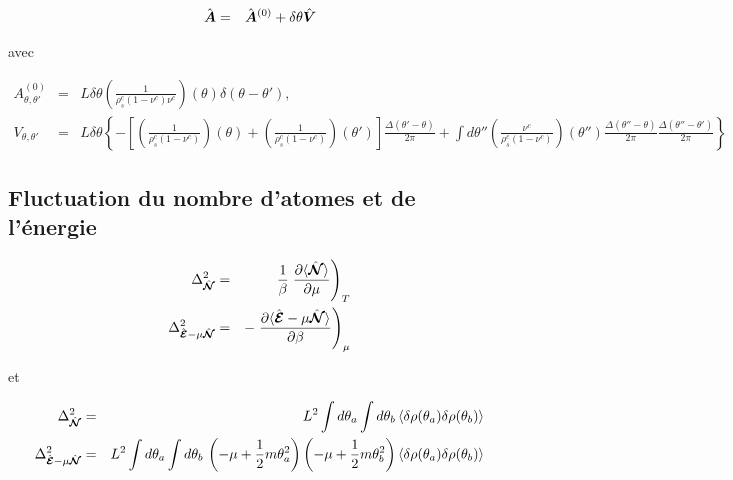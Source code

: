 {\begin{aff}
\begin{eqnarray*}
	\hat{\bm{A}} & = & \hat{\bm{A}}^{(0)} + \delta \theta \hat{\bm{V}}
\end{eqnarray*}

avec 

\begin{eqnarray*}
	A^{(0)}_{\theta , \theta'}  & = &  L\delta \theta \left ( \frac{ 1}{\rho^c_s ( 1  - \nu^c ) \nu^c } \right )(\theta)    \delta({\theta - \theta '})	,\\
	V_{\theta , \theta'}  &= & L \delta \theta \left \{ - \left [ \left ( \frac{1}{\rho^c_s( 1 - \nu^c) } \right ) ( \theta)  +  \left ( \frac{1}{\rho^c_s( 1 - \nu^c) } \right ) ( \theta' )\right ] \frac{ \Delta( \theta'- \theta )}{ 2 \pi } + \int d\theta''  \left ( \frac{\nu^c}{\rho^c_s( 1 - \nu^c) } \right )(\theta'') \frac{\Delta(\theta''- \theta)}{2 \pi}\frac{\Delta(\theta''- \theta')}{2 \pi}   \right \} 	
\end{eqnarray*}

\end{aff}

}


\subsection{Fluctuation du nombre d'atomes et de l'énergie}

\begin{eqnarray*}
	\Delta_{\hat{\bm{\mathcal{N}}}}^2  & = &  \frac{1}{\beta} \left . \frac{\partial \langle \hat{\bm{\mathcal{N}}} \rangle}{\partial \mu} \right )_T \\
	\Delta_{\hat{\bm{\mathcal{E}}}-\mu \hat{\bm{\mathcal{N}}}}^2  & = &  - \left . \frac{\partial \langle \hat{\bm{\mathcal{E}}}-\mu \hat{\bm{\mathcal{N}}} \rangle}{\partial \beta} \right )_\mu 
\end{eqnarray*}

et 

\begin{eqnarray*}
	\Delta_{\hat{\bm{\mathcal{N}}}}^2  &= & L^2 \int d\theta_a \int d \theta_b \, \langle \delta \rho(\theta_a) \delta \rho(\theta_b) \rangle \\
	\Delta_{\hat{\bm{\mathcal{E}}}-\mu \hat{\bm{\mathcal{N}}}}^2  & = & L^2 \int d\theta_a \int d \theta_b \, \left ( - \mu + \frac{1}2 m \theta_a^2  \right  )\left ( - \mu + \frac{1}2 m \theta_b^2  \right  )  \langle \delta \rho(\theta_a) \delta \rho(\theta_b) \rangle
\end{eqnarray*}

